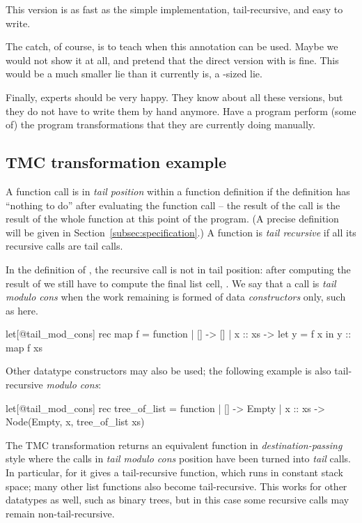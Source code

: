 This version is as fast as the simple implementation, tail-recursive,
and easy to write.

The catch, of course, is to teach when this 
annotation can be used. Maybe we would not show it at all, and pretend
that the direct  version with  is fine. This
would be a much smaller lie than it currently is,
a -sized lie.

Finally, experts should be very happy. They know about all these
versions, but they do not have to write them by hand anymore. Have
a program perform (some of) the program transformations that they are
currently doing manually.

\subsection{TMC transformation example}
\label{subsec:tmc_example}

A function call is in \emph{tail position} within a function
definition if the definition has ``nothing to do'' after evaluating
the function call -- the result of the call is the result of the whole
function at this point of the program. (A precise definition will be
given in Section~\ref{subsec:specification}.) A function is \emph{tail recursive}
if all its recursive calls are tail calls.

In the definition of , the recursive call is not in tail
position: after computing the result of  we still have
to compute the final list cell, . We say that a call is
\emph{tail modulo cons} when the work remaining is formed of data
\emph{constructors} only, such as \ocaml{(::)} here.

\begin{Ocaml}
let[@tail_mod_cons] rec map f = function
| [] -> []
| x :: xs ->
  let y = f x in
  y :: map f xs
\end{Ocaml}

Other datatype constructors may also be used; the following example is
also tail-recursive \emph{modulo cons}:

\begin{Ocaml}
let[@tail_mod_cons] rec tree_of_list = function
| [] -> Empty
| x :: xs -> Node(Empty, x, tree_of_list xs)
\end{Ocaml}

The TMC transformation returns an equivalent function in
\emph{destination-passing} style where the calls in \emph{tail modulo
  cons} position have been turned into \emph{tail} calls. In
particular, for  it gives a tail-recursive function, which
runs in constant stack space; many other list functions also become
tail-recursive. This works for other datatypes as well, such as binary trees, but in this case some recursive calls may remain non-tail-recursive.

